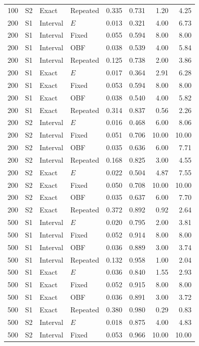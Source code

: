 \documentclass[12pt]{article}
\theoremstyle{definition}
\theoremstyle{remark}
\begin{document}
\begin{longtable}{rcllrrrr}
100 & S2 & Exact & Repeated & 0.335 & 0.731 & 1.20 & 4.25 \\
200 & S1 & Interval & $E$ & 0.013 & 0.321 & 4.00 & 6.73 \\
200 & S1 & Interval & Fixed & 0.055 & 0.594 & 8.00 & 8.00 \\
200 & S1 & Interval & OBF & 0.038 & 0.539 & 4.00 & 5.84 \\
200 & S1 & Interval & Repeated & 0.125 & 0.738 & 2.00 & 3.86 \\
200 & S1 & Exact & $E$ & 0.017 & 0.364 & 2.91 & 6.28 \\
200 & S1 & Exact & Fixed & 0.053 & 0.594 & 8.00 & 8.00 \\
200 & S1 & Exact & OBF & 0.038 & 0.540 & 4.00 & 5.82 \\
200 & S1 & Exact & Repeated & 0.314 & 0.837 & 0.56 & 2.26 \\
200 & S2 & Interval & $E$ & 0.016 & 0.468 & 6.00 & 8.06 \\
200 & S2 & Interval & Fixed & 0.051 & 0.706 & 10.00 & 10.00 \\
200 & S2 & Interval & OBF & 0.035 & 0.636 & 6.00 & 7.71 \\
200 & S2 & Interval & Repeated & 0.168 & 0.825 & 3.00 & 4.55 \\
200 & S2 & Exact & $E$ & 0.022 & 0.504 & 4.87 & 7.55 \\
200 & S2 & Exact & Fixed & 0.050 & 0.708 & 10.00 & 10.00 \\
200 & S2 & Exact & OBF & 0.035 & 0.637 & 6.00 & 7.70 \\
200 & S2 & Exact & Repeated & 0.372 & 0.892 & 0.92 & 2.64 \\
500 & S1 & Interval & $E$ & 0.020 & 0.795 & 2.00 & 3.81 \\
500 & S1 & Interval & Fixed & 0.052 & 0.914 & 8.00 & 8.00 \\
500 & S1 & Interval & OBF & 0.036 & 0.889 & 3.00 & 3.74 \\
500 & S1 & Interval & Repeated & 0.132 & 0.958 & 1.00 & 2.04 \\
500 & S1 & Exact & $E$ & 0.036 & 0.840 & 1.55 & 2.93 \\
500 & S1 & Exact & Fixed & 0.052 & 0.915 & 8.00 & 8.00 \\
500 & S1 & Exact & OBF & 0.036 & 0.891 & 3.00 & 3.72 \\
500 & S1 & Exact & Repeated & 0.380 & 0.980 & 0.29 & 0.83 \\
500 & S2 & Interval & $E$ & 0.018 & 0.875 & 4.00 & 4.83 \\
500 & S2 & Interval & Fixed & 0.053 & 0.966 & 10.00 & 10.00 \\

\end{longtable}
\end{document}
